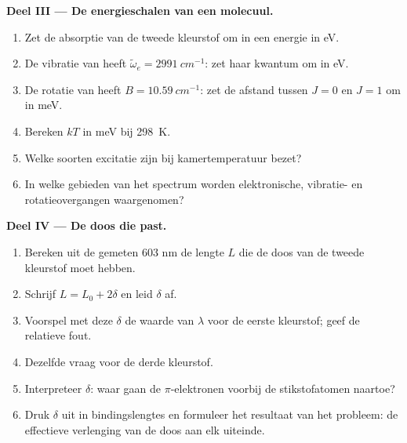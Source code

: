 \begin{problem}
\medskip\noindent\textbf{Deel III --- De energieschalen van een molecuul.}
\begin{enumerate}[resume]
  \item Zet de absorptie van de tweede kleurstof om in een energie in eV.
  \item De vibratie van  heeft $\tilde\omega_e = \qty{2991}{cm^{-1}}$:
        zet haar kwantum om in eV.
  \item De rotatie van  heeft $B = \qty{10.59}{cm^{-1}}$: zet de
        afstand tussen $J = 0$ en $J = 1$ om in meV.
  \item Bereken $kT$ in meV bij \qty{298}{K}.
  \item Welke soorten excitatie zijn bij kamertemperatuur bezet?
  \item In welke gebieden van het spectrum worden elektronische, vibratie-
        en rotatieovergangen waargenomen?
\end{enumerate}

\medskip\noindent\textbf{Deel IV --- De doos die past.}
\begin{enumerate}[resume]
  \item Bereken uit de gemeten 603 nm de lengte $L$ die de doos van de
        tweede kleurstof moet hebben.
  \item Schrijf $L = L_0 + 2\delta$ en leid $\delta$ af.
  \item Voorspel met deze $\delta$ de waarde van $\lambda$ voor de eerste
        kleurstof; geef de relatieve fout.
  \item Dezelfde vraag voor de derde kleurstof.
  \item Interpreteer $\delta$: waar gaan de $\pi$-elektronen voorbij de
        stikstofatomen naartoe?
  \item Druk $\delta$ uit in bindingslengtes en formuleer het resultaat van
        het probleem: de effectieve verlenging van de doos aan elk uiteinde.
\end{enumerate}
\end{problem}
